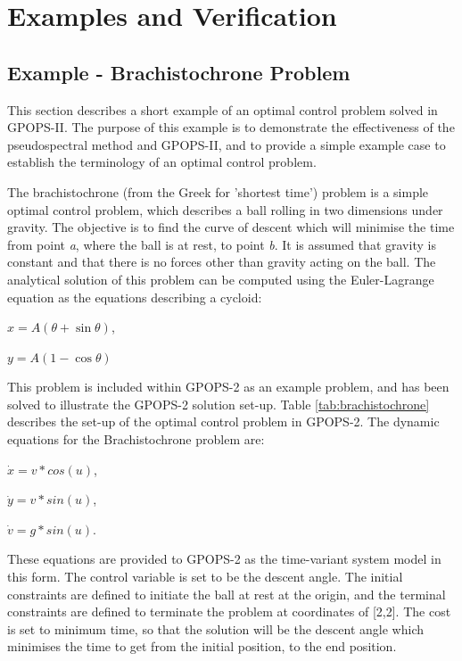\chapter{Examples and Verification}

\section{Example - Brachistochrone Problem}

This section describes a short example of an optimal control problem solved in GPOPS-II. The purpose of this example is to demonstrate the effectiveness of the pseudospectral method and GPOPS-II, and to provide a simple example case to establish the terminology of an optimal control problem.  


The brachistochrone (from the Greek for 'shortest time') problem is a simple optimal control problem, which describes a ball rolling in two dimensions under gravity. The objective is to find the curve of descent which will minimise the time from point \textit{a}, where the ball is at rest, to point \textit{b}. It is assumed that gravity is constant and that there is no forces other than gravity acting on the ball. 
The analytical solution of this problem can be computed using the Euler-Lagrange equation as the equations describing a cycloid:

$x = A(\theta + \sin\theta) $,

$y=A(1 - \cos\theta)$

This problem is included within GPOPS-2 as an example problem, and has been solved to illustrate the GPOPS-2 solution set-up\cite{Rao2010}. Table \ref{tab:brachistochrone} describes the set-up of the optimal control problem in GPOPS-2. The dynamic equations for the Brachistochrone problem are:

$\dot{x} = v*cos(u)$,

$\dot{y} = v*sin(u)$,

$\dot{v} = g*sin(u)$.

\noindent These equations are provided to GPOPS-2 as the time-variant system model in this form. The control variable is set to be the descent angle. The initial constraints are defined to initiate the ball at rest at the origin, and the terminal constraints are defined to terminate the problem at coordinates of [2,2]. The cost is set to minimum time, so that the solution will be the descent angle which minimises the time to get from the initial position, to the end position. 

